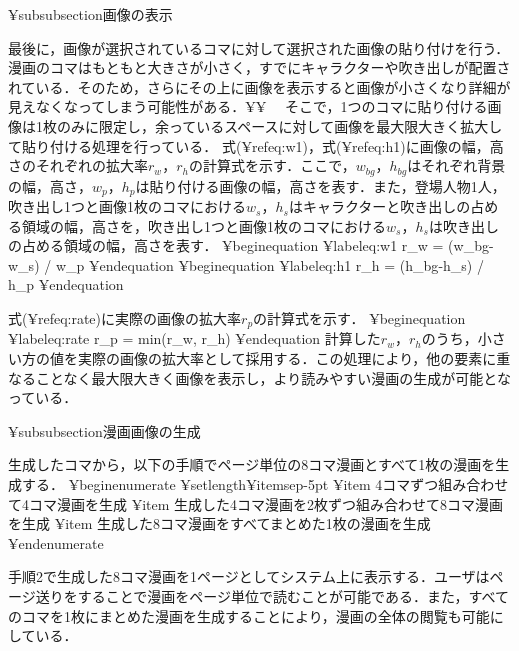 ¥subsubsection{画像の表示}

最後に，画像が選択されているコマに対して選択された画像の貼り付けを行う．漫画のコマはもともと大きさが小さく，すでにキャラクターや吹き出しが配置されている．そのため，さらにその上に画像を表示すると画像が小さくなり詳細が見えなくなってしまう可能性がある．¥¥
　そこで，1つのコマに貼り付ける画像は1枚のみに限定し，余っているスペースに対して画像を最大限大きく拡大して貼り付ける処理を行っている．
式(¥ref{eq:w1})，式(¥ref{eq:h1})に画像の幅，高さのそれぞれの拡大率$r_{w}$，$r_{h}$の計算式を示す．ここで，$w_{bg}$，$h_{bg}$はそれぞれ背景の幅，高さ，$w_{p}$，$h_{p}$は貼り付ける画像の幅，高さを表す．また，登場人物1人，吹き出し1つと画像1枚のコマにおける$w_{s}$，$h_{s}$はキャラクターと吹き出しの占める領域の幅，高さを，吹き出し1つと画像1枚のコマにおける$w_{s}$，$h_{s}$は吹き出しの占める領域の幅，高さを表す．
¥begin{equation}
¥label{eq:w1}
r_w = (w_{bg}-w_{s}) / w_{p}
¥end{equation}
¥begin{equation}
¥label{eq:h1}
r_h = (h_{bg}-h_{s}) / h_{p}
¥end{equation}

式(¥ref{eq:rate})に実際の画像の拡大率$r_{p}$の計算式を示す．
¥begin{equation}
¥label{eq:rate}
r_{p} = min(r_w, r_h)
¥end{equation}
計算した$r_{w}$，$r_{h}$のうち，小さい方の値を実際の画像の拡大率として採用する．この処理により，他の要素に重なることなく最大限大きく画像を表示し，より読みやすい漫画の生成が可能となっている．

¥subsubsection{漫画画像の生成}

生成したコマから，以下の手順でページ単位の8コマ漫画とすべて1枚の漫画を生成する．
¥begin{enumerate}
¥setlength{¥itemsep}{-5pt}
¥item 4コマずつ組み合わせて4コマ漫画を生成
¥item 生成した4コマ漫画を2枚ずつ組み合わせて8コマ漫画を生成
¥item 生成した8コマ漫画をすべてまとめた1枚の漫画を生成
¥end{enumerate}

手順2で生成した8コマ漫画を1ページとしてシステム上に表示する．ユーザはページ送りをすることで漫画をページ単位で読むことが可能である．また，すべてのコマを1枚にまとめた漫画を生成することにより，漫画の全体の閲覧も可能にしている．
